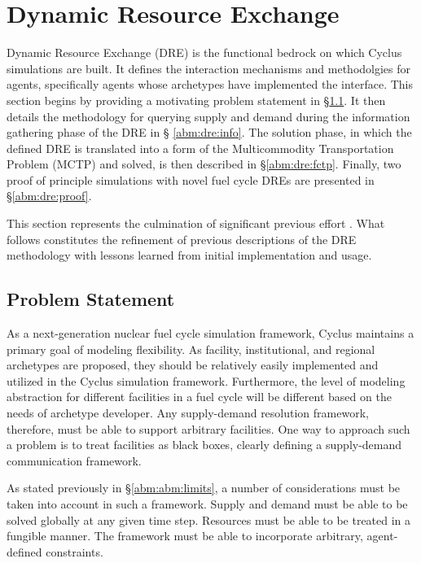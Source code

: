 \section{Dynamic Resource Exchange}\label{abm:dre}

Dynamic Resource Exchange (DRE) is the functional bedrock on which Cyclus
simulations are built. It defines the interaction mechanisms and methodolgies
for agents, specifically agents whose archetypes have implemented the
 interface. This section begins by providing a motivating problem
statement in \S \ref{abm:dre:prob}. It then details the methodology for querying
supply and demand during the information gathering phase of the DRE in \S
\ref{abm:dre:info}. The solution phase, in which the defined DRE is translated
into a form of the Multicommodity Transportation Problem (MCTP) and solved, is
then described in \S \ref{abm:dre:fctp}. Finally, two proof of principle
simulations with novel fuel cycle DREs are presented in \S \ref{abm:dre:proof}.

This section represents the culmination of significant previous effort
\cite{gidden_agent-based_2013, gidden_agent-based_2014,
  gidden_agent-based_slc_2013}. What follows constitutes the refinement of
previous descriptions of the DRE methodology with lessons learned from initial
implementation and usage.

\subsection{Problem Statement}\label{abm:dre:prob}

As a next-generation nuclear fuel cycle simulation framework, Cyclus maintains a
primary goal of modeling flexibility. As facility, institutional, and regional
archetypes are proposed, they should be relatively easily implemented and
utilized in the Cyclus simulation framework. Furthermore, the level of modeling
abstraction for different facilities in a fuel cycle will be different based on
the needs of archetype developer. Any supply-demand resolution framework,
therefore, must be able to support arbitrary facilities. One way to approach
such a problem is to treat facilities as black boxes, clearly defining a
supply-demand communication framework.

As stated previously in \S \ref{abm:abm:limits}, a number of considerations must
be taken into account in such a framework. Supply and demand must be able to be
solved globally at any given time step. Resources must be able to be treated in
a fungible manner. The framework must be able to incorporate arbitrary,
agent-defined constraints.

